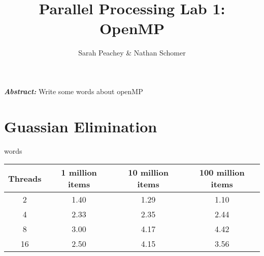 \documentclass[12pt]{article}
\begin{document}
\title{Parallel Processing Lab 1: OpenMP}
\author{Sarah Peachey \& Nathan Schomer}
\maketitle

\textbf{\textit{Abstract:}} Write some words about openMP

\newpage

\section{Guassian Elimination\label{guass}}
\qquad words 

\begin{center}
\hspace*{-2.5cm}
\begin{tabular}{@{}|c|c|c|c|}
\hline
Threads & 1 million items & 10 million items & 100 million items \\
\hline 
2 & 1.40 & 1.29 & 1.10 \\
\hline
4 & 2.33 & 2.35 & 2.44 \\
\hline
8 & 3.00 & 4.17 & 4.42 \\
\hline 
16 & 2.50 & 4.15 & 3.56 \\
\hline 
\end{tabular}
\hspace*{-2.5cm}
\end{center}
\end{document}
